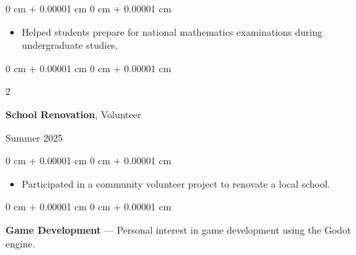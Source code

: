 \documentclass[10pt, letterpaper]{article}
\newenvironment{highlights}{
    \begin{itemize}[
        topsep=0.10 cm,
        parsep=0.10 cm,
        partopsep=0pt,
        itemsep=0pt,
        leftmargin=0 cm + 10pt
    ]
}{
    \end{itemize}
}
\newenvironment{onecolentry}{
    \begin{adjustwidth}{
        0 cm + 0.00001 cm
    }{
        0 cm + 0.00001 cm
    }
}{
    \end{adjustwidth}
}
\newenvironment{twocolentry}[2][]{
    \onecolentry
    \def\secondColumn{#2}
    \setcolumnwidth{\fill, 4.5 cm}
    \begin{paracol}{2}
}{
    \switchcolumn \raggedleft \secondColumn
    \end{paracol}
    \endonecolentry
}
\begin{document}
\vspace{0.10 cm}
\begin{onecolentry}
    \begin{highlights}
        \item Helped students prepare for national mathematics examinations during undergraduate studies.
    \end{highlights}
\end{onecolentry}

\vspace{0.2 cm}

\begin{twocolentry}{
    Summer 2025
}
    \textbf{School Renovation}, Volunteer
\end{twocolentry}

\vspace{0.10 cm}
\begin{onecolentry}
    \begin{highlights}
        \item Participated in a community volunteer project to renovate a local school.
    \end{highlights}
\end{onecolentry}

\vspace{0.2 cm}

\begin{onecolentry}
    \textbf{Game Development} — Personal interest in game development using the Godot engine.
\end{onecolentry}

\vspace{0.2 cm}
\end{document}
